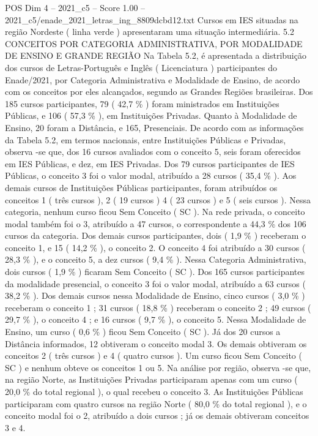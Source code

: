 \begin{textsample}{POS Dim 4 – 2021\_c5 – Score 1.00 – 2021\_c5/enade\_2021\_letras\_ing\_8809dcbd12.txt}
Cursos em IES situadas na região Nordeste ( linha verde ) apresentaram uma situação intermediária. 5.2 CONCEITOS POR CATEGORIA ADMINISTRATIVA, POR MODALIDADE DE ENSINO E GRANDE REGIÃO Na Tabela 5.2, é apresentada a distribuição dos cursos de Letras-Português e Inglês ( Licenciatura ) participantes do Enade/2021, por Categoria Administrativa e Modalidade de Ensino, de acordo com os conceitos por eles alcançados, segundo as Grandes Regiões brasileiras.
Dos 185 cursos participantes, 79 ( 42,7 \% ) foram ministrados em Instituições Públicas, e 106 ( 57,3 \% ), em Instituições Privadas.
Quanto à Modalidade de Ensino, 20 foram a Distância, e 165, Presenciais.
De acordo com as informações da Tabela 5.2, em termos nacionais, entre Instituições Públicas e Privadas, observa -se que, dos 16 cursos avaliados com o conceito 5, seis foram oferecidos em IES Públicas, e dez, em IES Privadas.
Dos 79 cursos participantes de IES Públicas, o conceito 3 foi o valor modal, atribuído a 28 cursos ( 35,4 \% ).
Aos demais cursos de Instituições Públicas participantes, foram atribuídos os conceitos 1 ( três cursos ), 2 ( 19 cursos ) 4 ( 23 cursos ) e 5 ( seis cursos ).
Nessa categoria, nenhum curso ficou Sem Conceito ( SC ).
Na rede privada, o conceito modal também foi o 3, atribuído a 47 cursos, o correspondente a 44,3 \% dos 106 cursos da categoria.
Dos demais cursos participantes, dois ( 1,9 \% ) receberam o conceito 1, e 15 ( 14,2 \% ), o conceito 2.
O conceito 4 foi atribuído a 30 cursos ( 28,3 \% ), e o conceito 5, a dez cursos ( 9,4 \% ).
Nessa Categoria Administrativa, dois cursos ( 1,9 \% ) ficaram Sem Conceito ( SC ).
Dos 165 cursos participantes da modalidade presencial, o conceito 3 foi o valor modal, atribuído a 63 cursos ( 38,2 \% ).
Dos demais cursos nessa Modalidade de Ensino, cinco cursos ( 3,0 \% ) receberam o conceito 1 ; 31 cursos ( 18,8 \% ) receberam o conceito 2 ; 49 cursos ( 29,7 \% ), o conceito 4 ; e 16 cursos ( 9,7 \% ), o conceito 5.
Nessa Modalidade de Ensino, um curso ( 0,6 \% ) ficou Sem Conceito ( SC ).
Já dos 20 cursos a Distância informados, 12 obtiveram o conceito modal 3.
Os demais obtiveram os conceitos 2 ( três cursos ) e 4 ( quatro cursos ).
Um curso ficou Sem Conceito ( SC ) e nenhum obteve os conceitos 1 ou 5.
Na análise por região, observa -se que, na região Norte, as Instituições Privadas participaram apenas com um curso ( 20,0 \% do total regional ), o qual recebeu o conceito 3.
As Instituições Públicas participaram com quatro cursos na região Norte ( 80,0 \% do total regional ), e o conceito modal foi o 2, atribuído a dois cursos ; já os demais obtiveram conceitos 3 e 4.

\end{textsample}
